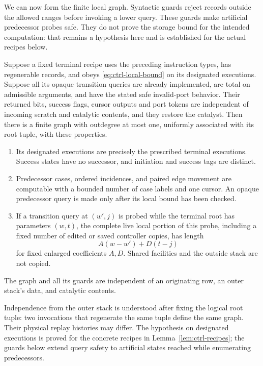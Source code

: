 We can now form the finite local graph. Syntactic guards reject records outside the allowed ranges before invoking a lower query. These guards make artificial predecessor probes safe. They do not prove the storage bound for the intended computation: that remains a hypothesis here and is established for the actual recipes below.

\begin{lemma}\label{lem:ctrl-local-graph}
Suppose a fixed terminal recipe uses the preceding instruction types,
has regenerable records, and obeys
\eqref{eq:ctrl-local-bound} on its designated executions.  Suppose all
its opaque transition queries are already implemented, are total on
admissible arguments, and have the stated safe invalid-port behavior.
Their returned bits, success flags, cursor outputs and port tokens are
independent of incoming scratch and catalytic contents, and they restore
the catalyst.  Then there is a finite graph with outdegree at
most one, uniformly associated with its root tuple, with these
properties.
\begin{enumerate}
\item Its designated executions are precisely the prescribed terminal
  executions.  Success states have no successor, and initiation and
  success tags are distinct.
\item Predecessor cases, ordered incidences, and paired edge movement
  are computable with a bounded number of case labels and one cursor.
  An opaque predecessor query is made only after its local bound has
  been checked.
\item If a transition query at $(w',j)$ is probed while the terminal
  root has parameters $(w,t)$, the complete live local portion of this
  probe, including a fixed number of edited or saved controller copies,
  has length
  \begin{equation}\label{eq:ctrl-neighbor-bound}
  A(w-w')+D(t-j)
  \end{equation}
  for fixed enlarged coefficients $A,D$.  Shared facilities and the
  outside stack are not copied.
\end{enumerate}
The graph and all its guards are independent of an originating row,
an outer stack's data, and catalytic contents.
\end{lemma}

Independence from the outer stack is understood after fixing the logical
root tuple: two invocations that regenerate the same tuple define the
same graph.  Their physical replay histories may differ.  The hypothesis
on designated executions is proved for the concrete recipes in
Lemma~\ref{lem:ctrl-recipes}; the guards below extend query safety to
artificial states reached while enumerating predecessors.

